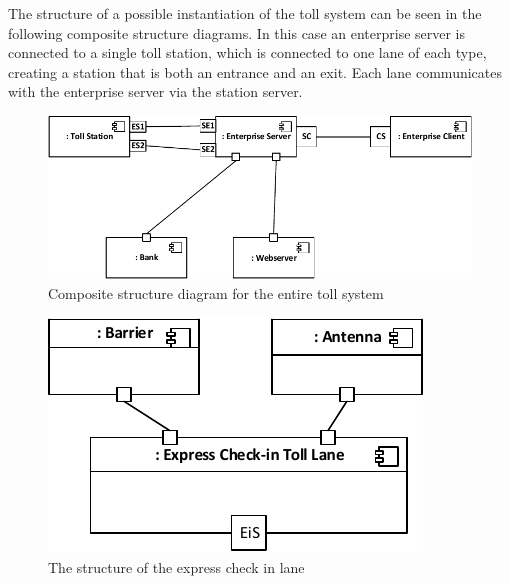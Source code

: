 The structure of a possible instantiation of the toll system can be seen in the following composite structure diagrams. In this case an enterprise server is connected to a single toll station, which is connected to one lane of each type, creating a station that is both an entrance and an exit. Each lane communicates with the enterprise server via the station server.
\\
\begin{figure}[H]
\centerline{\includegraphics[width=\textwidth]{img/composite_structure_diagram/cscd_enterprise}}
\caption{Composite structure diagram for the entire toll system}
\label{fig:csd_e}
\end{figure}

\begin{figure}[H]
\centerline{\includegraphics[width=\textwidth]{img/composite_structure_diagram/cscd_toll_lane_express_in}}
\caption{The structure of the express check in lane}
\label{fig:csd_tlei}
\end{figure}

